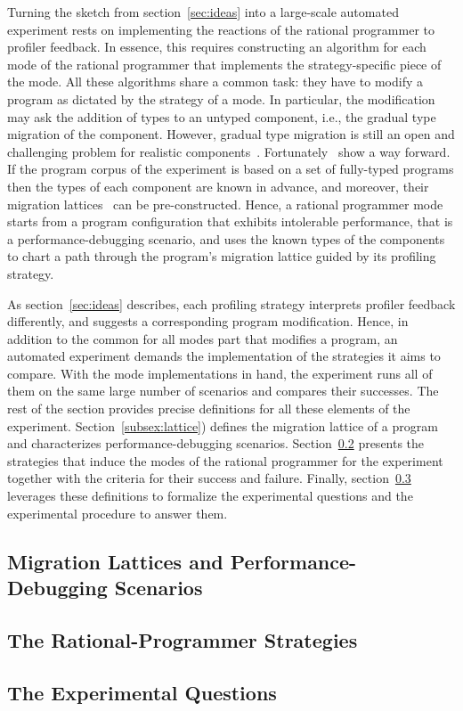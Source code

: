 
Turning the sketch from section~\ref{sec:ideas} into a large-scale
automated experiment rests on implementing the reactions of the rational
programmer to profiler feedback. In essence, this requires constructing an
algorithm for each mode of the rational programmer that implements the
strategy-specific piece of the mode. All these algorithms share a  common
task: they have to modify a program as dictated by the
strategy of a mode.  In particular, the modification may ask the addition
of types to an untyped component, i.e., the gradual type migration of the
component.  However, gradual type migration is still an open and challenging
problem for realistic components~\cite{rch:in-out-infer-gt,
mp:gt-decidable, ccew:gt-migrate, msi:gt-infer-hm, gc:gt-infer,
cagg-solver-based-migration, km:ts-type-evo}.
Fortunately~\citep{lgfd-icfp-2021} show a way forward. If the program
corpus of the experiment is based on a set of fully-typed programs then
the types of each component are known in advance, and moreover, their
migration  lattices~\citep{tfgnvf-popl-2016} can be pre-constructed.
Hence, a rational programmer mode starts from a program configuration
that exhibits intolerable performance, that is a performance-debugging
scenario, and uses the known types of the components to chart a path
through the program's migration lattice guided by its profiling strategy.

As section~\ref{sec:ideas} describes, each profiling strategy interprets
profiler feedback differently, and suggests a corresponding program
modification. Hence, in addition to the common for all modes part that
modifies a program, an automated experiment demands the implementation of
the strategies it aims to compare. With the mode implementations in hand,
the experiment runs all of them on the same large number of scenarios and
compares their successes. The rest of the section provides precise
definitions for all these elements of the experiment.
Section~\ref{subsex:lattice}) defines the migration lattice of a program
and characterizes performance-debugging scenarios.
Section~\ref{subsec:strategies} presents the strategies that induce the
modes of the rational programmer for the experiment together with the
criteria for their success and failure. Finally,
section~\ref{subsec:questions} leverages these definitions to formalize
the experimental questions and the experimental procedure to answer
them.

\subsection{Migration Lattices and Performance-Debugging Scenarios}
\label{subsec:lattice}

\subsection{The Rational-Programmer Strategies}
\label{subsec:strategies}

\subsection{The Experimental Questions}
\label{subsec:questions}

